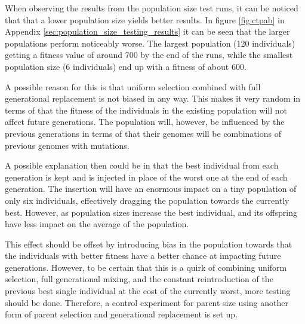 When observing the results from the population size test runs, it can be noticed that that a lower population size yields better results. In figure \ref{fig:ctpab} in Appendix \ref{sec:population_size_testing_results} it can be seen that the larger populations perform noticeably worse. The largest population (120 individuals) getting a fitness value of around 700 by the end of the runs, while the smallest population size (6 individuals) end up with a fitness of about 600.

A possible reason for this is that uniform selection combined with full generational replacement is not biased in any way. This makes it very random in terms of that the fitness of the individuals in the existing population will not affect future generations. The population will, however, be influenced by the previous generations in terms of that their genomes will be combinations of previous genomes with mutations.

A possible explanation then could be in that the best individual from each generation is kept and is injected in place of the worst one at the end of each generation. The insertion will have an enormous impact on a tiny population of only six individuals, effectively dragging the population towards the currently best. However, as population sizes increase the best individual, and its offspring have less impact on the average of the population.

This effect should be offset by introducing bias in the population towards that the individuals with better fitness have a better chance at impacting future generations. However, to be certain that this is a quirk of combining uniform selection, full generational mixing, and the constant reintroduction of the previous best single individual at the cost of the currently worst, more testing should be done. Therefore, a control experiment for parent size using another form of parent selection and generational replacement is set up.



